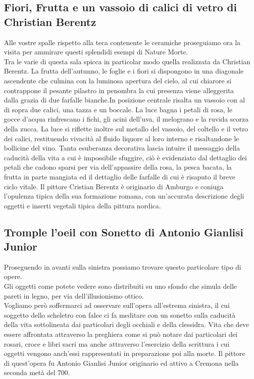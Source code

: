 \documentclass[hidelinks,12pt,a4paper]{article}
\begin{document}
\begin{flushleft}
			\subsection{Fiori, Frutta e un vassoio di calici di vetro di Christian Berentz}
			Alle vostre spalle rispetto alla teca contenente le ceramiche proseguiamo ora la visita per ammirare questi splendidi esempi di Nature Morte.\\
			Tra le varie di questa sala spicca in particolar modo quella realizzata da Christian Berentz. La frutta dell'autunno, le foglie e i fiori si dispongono in una diagonale ascendente che culmina con la luminosa apertura del cielo, al cui chiarore si contrappone il pesante pilastro in penombra la cui presenza viene alleggerita dalla grazia di due farfalle bianche.In posizione centrale risalta un vassoio con al di sopra due calici, una tazza e un boccale. La luce bagna i petali di rosa, le gocce d'acqua rinfrescano i fichi, gli acini dell'uva, il melograno e la ruvida scorza della  zucca. La luce si riflette inoltre sul metallo del vassoio, del coltello e il vetro dei calici, restituendo vivacità al fluido liquore al loro interno e risaltandone le bollicine del vino. Tanta esuberanza decorativa lascia intuire il messaggio della caducità della vita a cui è impossibile sfuggire, ciò è evidenziato dal dettaglio dei petali che cadono sparsi per via dell'appassire della rosa, la pesca bacata, la frutta in parte mangiata ed il dettaglio delle farfalle di cui è risaputo il breve ciclo vitale. Il pittore Cristian Berentz è originario di Amburgo e coniuga l'opulenza tipica della sua formazione romana, con un'accurata descrizione degli oggetti e inserti vegetali tipica della pittura nordica.
	
			\subsection{Tromple l'oeil con Sonetto di Antonio Gianlisi Junior}
			Proseguendo in avanti sulla sinistra possiamo trovare questo particolare tipo di opere.\\
			Gli oggetti come potete vedere sono distribuiti su uno sfondo che simula delle pareti in legno, per via dell'illusionismo ottico.\\
			Vogliamo però soffermarci ad osservare sull'opera all'estrema sinistra, il cui soggetto dello scheletro con falce ci fa meditare con un sonetto sulla caducità della vita sottolineata dai particolari degli occhiali e della clessidra. Vita che deve essere affrontata attraverso la preghiera come si può notare dai particolari dei rosari, croce e libri sacri ma anche attraverso l'esercizio della scrittura i cui oggetti vengono anch'essi rappresentati in preparazione poi alla morte. Il pittore di quest'opera fu Antonio Gianlisi Junior originario ed attivo a Cremona nella seconda metà del 700.
	

\end{flushleft}
\end{document}

